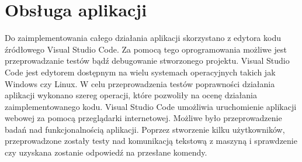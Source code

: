 \section{Obsługa aplikacji}
Do zaimplementowania całego działania aplikacji skorzystano z edytora kodu źródłowego Visual Studio Code. Za pomocą tego oprogramowania możliwe jest przeprowadzanie testów bądź debugowanie stworzonego projektu. Visual Studio Code jest edytorem dostępnym na wielu systemach operacyjnych takich jak Windows czy Linux. W celu przeprowadzenia testów poprawności działania aplikacji wykonano szereg operacji, które pozwoliły na ocenę działania zaimplementowanego kodu. Visual Studio Code umożliwia uruchomienie aplikacji webowej za pomocą przeglądarki internetowej. Możliwe było przeprowadzenie badań nad funkcjonalnością aplikacji. Poprzez stworzenie kilku użytkowników, przeprowadzone zostały testy nad komunikacją tekstową z maszyną i sprawdzenie czy uzyskana zostanie odpowiedź na przesłane komendy.

